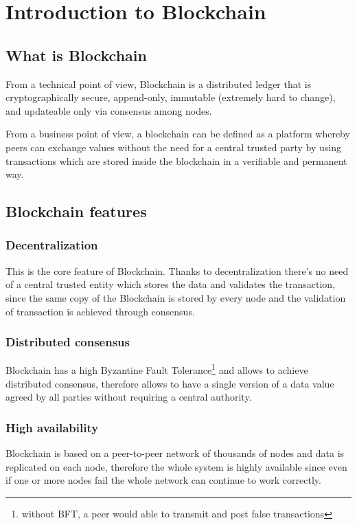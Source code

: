 \section{Introduction to Blockchain}
\subsection{What is Blockchain}
From a technical point of view, Blockchain is a distributed ledger that is cryptographically
secure, append-only, immutable (extremely hard to change), and updateable only
via consensus among nodes.

From a business point of view, a blockchain can be defined as a platform
whereby peers can exchange values without the need for a central trusted party
by using transactions which are stored inside the blockchain in a verifiable and
permanent way.












\subsection{Blockchain features}

\subsubsection*{Decentralization}
This is the core feature of Blockchain. Thanks to decentralization there's no
need of a central trusted entity which stores the data and validates the
transaction, since the same copy of the Blockchain is stored by every node and
the validation of transaction is achieved through consensus.

\subsubsection*{Distributed consensus}
Blockchain has a high Byzantine Fault Tolerance\footnote{without BFT, a peer
would able to transmit and post false transactions} and allows to achieve
distributed consensus, therefore allows to have a single version of a data value
agreed by all parties without requiring a central authority.

\subsubsection*{High availability}
Blockchain is based on a peer-to-peer network of thousands of nodes and data is
replicated on each node, therefore the whole system is highly available since even
if one or more nodes fail the whole network can continue to work correctly.


